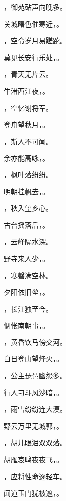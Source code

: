 \documentclass[12pt, a4paper, addpoints, answers]{exam}
\begin{document}
\begin{questions}
\question[3] ，御苑砧声向晚多。

\question[3] 关城曙色催寒近，。

\question[3] ，空令岁月易蹉跎。

\question[3] 莫见长安行乐处，。

\question[3] ，青天无片云。

\question[3] 牛渚西江夜，。

\question[3] ，空忆谢将军。

\question[3] 登舟望秋月，。

\question[3] ，斯人不可闻。

\question[3] 余亦能高咏，。

\question[3] ，枫叶落纷纷。

\question[3] 明朝挂帆去，。

\question[3] ，秋入望乡心。

\question[3] 古台摇落后，。

\question[3] ，云峰隔水深。

\question[3] 野寺来人少，。

\question[3] ，寒磬满空林。

\question[3] 夕阳依旧垒，。

\question[3] ，长江独至今。

\question[3] 惆怅南朝事，。

\question[3] ，黄昏饮马傍交河。

\question[3] 白日登山望烽火，。

\question[3] ，公主琵琶幽怨多。

\question[3] 行人刁斗风沙暗，。

\question[3] ，雨雪纷纷连大漠。

\question[3] 野云万里无城郭，。

\question[3] ，胡儿眼泪双双落。

\question[3] 胡雁哀鸣夜夜飞，。

\question[3] ，应将性命逐轻车。

\question[3] 闻道玉门犹被遮，。


\end{questions}
\end{document}
